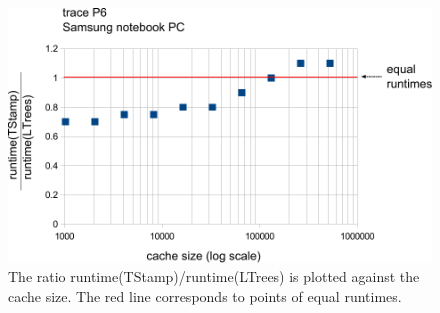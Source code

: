 \documentclass[a4paper,12pt, titlepage]{article}  %
\begin{document}
\begin{figure}[p]
	\centering
	\includegraphics[scale=0.8]{./experiments/samsung_P6.pdf}
	\caption{The ratio runtime(TStamp)/runtime(LTrees) is plotted against the cache size.
                     The red line corresponds to points of equal runtimes.} 
	\label{fig:samsung_P6}
\end{figure}
\end{document}
